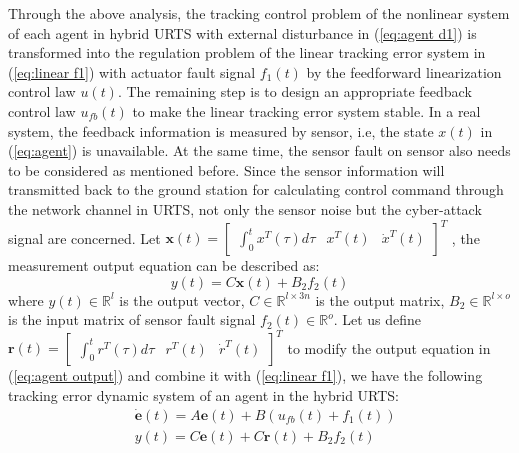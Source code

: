 \documentclass{ieeeaccess}
\begin{document}
Through the above analysis, the tracking control problem of the nonlinear system of each agent in hybrid URTS with external disturbance in (\ref{eq:agent d1}) is transformed into the regulation problem of the linear tracking error system in (\ref{eq:linear f1}) with actuator fault signal $f_1(t)$ by the feedforward linearization control law $u(t)$. The remaining step is to design an appropriate feedback control law $u_{fb}(t)$ to make the linear tracking error system stable. In a real system, the feedback information is measured by sensor, i.e, the state $x(t)$ in (\ref{eq:agent}) is unavailable. At the same time, the sensor fault on sensor also needs to be considered as mentioned before. Since the sensor information will transmitted back to the ground station for calculating control command through the network channel in URTS, not only the sensor noise but the cyber-attack signal are concerned. Let $\pmb{x}(t)=\begin{bmatrix}
    \int_{0}^{t}x^T(\tau)d\tau & x^T(t) & \dot{x}^T(t)
\end{bmatrix}^T$
, the measurement output equation can be described as:
\begin{equation} \label{eq:agent output}
    y(t) = C\pmb{x}(t) + B_2f_2(t)
\end{equation}
where $y(t)\in\mathbb{R}^{l}$ is the output vector, $C\in\mathbb{R}^{l\times 3n}$ is the output matrix, $B_2\in\mathbb{R}^{l\times o}$ is the input matrix of sensor fault signal $f_2(t)\in\mathbb{R}^o$. Let us define $\pmb{r}(t)=\begin{bmatrix}
    \int_{0}^{t}r^T(\tau)d\tau & r^T(t) & \dot{r}^T(t)
\end{bmatrix}^T$ to modify the output equation in (\ref{eq:agent output}) and combine it with (\ref{eq:linear f1}), we have the following tracking error dynamic system of an agent in the hybrid URTS:
\begin{equation} \label{eq:error}
    \begin{split}
        & \dot{\pmb{e}}(t)=A\pmb{e}(t)+B(u_{fb}(t)+f_1(t)) \\
        & y(t) = C\pmb{e}(t) + C\pmb{r}(t) + B_2f_2(t)   
    \end{split}  
\end{equation}
\end{document}
